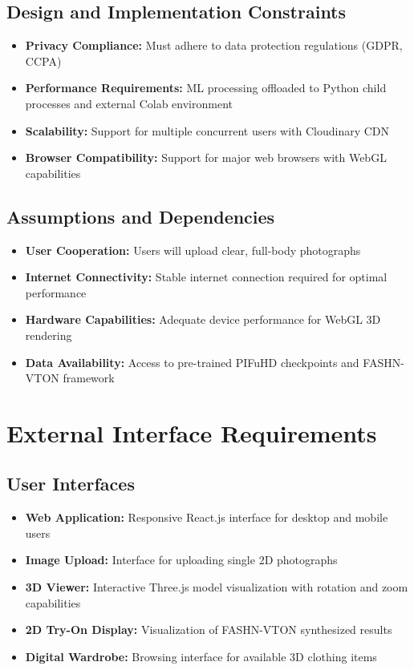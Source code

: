 \documentclass[12pt,a4paper,oneside]{report}
\begin{document}
\subsection{Design and Implementation Constraints}
\begin{itemize}
    \item \textbf{Privacy Compliance:} Must adhere to data protection regulations (GDPR, CCPA)
    \item \textbf{Performance Requirements:} ML processing offloaded to Python child processes and external Colab environment
    \item \textbf{Scalability:} Support for multiple concurrent users with Cloudinary CDN
    \item \textbf{Browser Compatibility:} Support for major web browsers with WebGL capabilities
\end{itemize}

\subsection{Assumptions and Dependencies}
\begin{itemize}
    \item \textbf{User Cooperation:} Users will upload clear, full-body photographs
    \item \textbf{Internet Connectivity:} Stable internet connection required for optimal performance
    \item \textbf{Hardware Capabilities:} Adequate device performance for WebGL 3D rendering
    \item \textbf{Data Availability:} Access to pre-trained PIFuHD checkpoints and FASHN-VTON framework
\end{itemize}

\section{External Interface Requirements}

\subsection{User Interfaces}
\begin{itemize}
    \item \textbf{Web Application:} Responsive React.js interface for desktop and mobile users
    \item \textbf{Image Upload:} Interface for uploading single 2D photographs
    \item \textbf{3D Viewer:} Interactive Three.js model visualization with rotation and zoom capabilities
    \item \textbf{2D Try-On Display:} Visualization of FASHN-VTON synthesized results
    \item \textbf{Digital Wardrobe:} Browsing interface for available 3D clothing items
\end{itemize}
\end{document}
